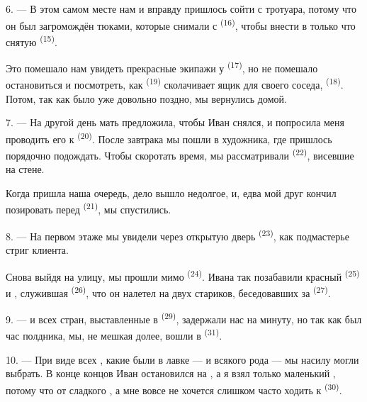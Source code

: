 6. --- В этом самом месте нам и вправду пришлось сойти с тротуара, потому
что он был загромождён тюками, которые снимали с 
\textsuperscript{(16)}, чтобы внести в только что снятую 
\textsuperscript{(15)}.

Это помешало нам увидеть прекрасные экипажи у 
\textsuperscript{(17)}, но не помешало остановиться и посмотреть, как
 \textsuperscript{(19)} сколачивает ящик для своего соседа,
 \textsuperscript{(18)}. Потом, так
как было уже довольно поздно, мы вернулись домой.

\VUsaut{3.0mm}

7. --- На другой день мать предложила, чтобы Иван снялся, и попросила меня
проводить его к  \textsuperscript{(20)}. После завтрака мы
пошли в  художника, где пришлось порядочно подождать. Чтобы
скоротать время, мы рассматривали  \textsuperscript{(22)},
висевшие на стене.

Когда пришла наша очередь, дело вышло недолгое, и, едва мой друг кончил
позировать перед  \textsuperscript{(21)}, мы спустились.

8. --- На первом этаже мы увидели через открытую дверь
 \textsuperscript{(23)}, как подмастерье стриг клиента.

Снова выйдя на улицу, мы прошли мимо  \textsuperscript{(24)}.
Ивана так позабавили красный  \textsuperscript{(25)} и
, служившая  \textsuperscript{(26)}, что он
налетел на двух стариков, беседовавших за 
\textsuperscript{(27)}.

\VUsaut{3.0mm}

9. ---  и  всех стран, выставленные в
  \textsuperscript{(29)}, задержали нас на минуту,
но так как был час полдника, мы, не мешкая долее, вошли в
 \textsuperscript{(31)}.

10. --- При виде всех , какие были в лавке ---
 и  всякого рода --- мы
насилу могли выбрать. В конце концов Иван остановился на
, а я взял только маленький
, потому что от сладкого , а
мне вовсе не хочется слишком часто ходить к 
\textsuperscript{(30)}.

